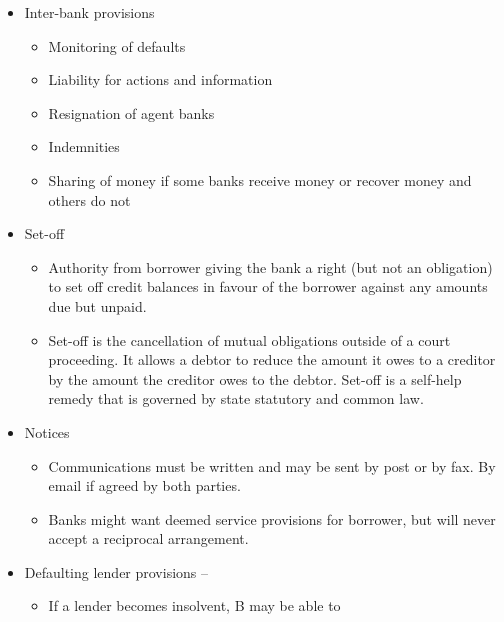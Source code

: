 \documentclass[
]{article}
\providecommand{\tightlist}{%
  \setlength{\itemsep}{0pt}\setlength{\parskip}{0pt}}
\begin{document}
\begin{itemize}
\tightlist
\item
  Inter-bank provisions

  \begin{itemize}
  \tightlist
  \item
    Monitoring of defaults
  \item
    Liability for actions and information
  \item
    Resignation of agent banks
  \item
    Indemnities
  \item
    Sharing of money if some banks receive money or recover money and
    others do not
  \end{itemize}
\item
  Set-off

  \begin{itemize}
  \tightlist
  \item
    Authority from borrower giving the bank a right (but not an
    obligation) to set off credit balances in favour of the borrower
    against any amounts due but unpaid.
  \item
    Set-off is the cancellation of mutual obligations outside of a court
    proceeding. It allows a debtor to reduce the amount it owes to a
    creditor by the amount the creditor owes to the debtor. Set-off is a
    self-help remedy that is governed by state statutory and common law.
  \end{itemize}
\item
  Notices

  \begin{itemize}
  \tightlist
  \item
    Communications must be written and may be sent by post or by fax. By
    email if agreed by both parties.
  \item
    Banks might want deemed service provisions for borrower, but will
    never accept a reciprocal arrangement.
  \end{itemize}
\item
  Defaulting lender provisions --

  \begin{itemize}
  \tightlist
  \item
    If a lender becomes insolvent, B may be able to


\end{itemize}
\end{itemize}
\end{document}
